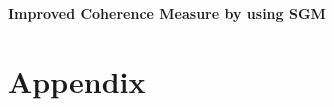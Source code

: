 \documentclass  [
  paper    = a4,
  BCOR     = 10mm,
  twoside,
  fontsize = 12pt,
  fleqn,
  toc      = bibnumbered,
  toc      = listofnumbered,
  numbers  = noendperiod,
  headings = normal,
  listof   = leveldown,
  version  = 3.03
]                                       {scrreprt}
\begin{document}
\subsection*{Improved Coherence Measure by using SGM}

  \part{Appendix}
  \begin{appendix}

\end{appendix}
\end{document}
